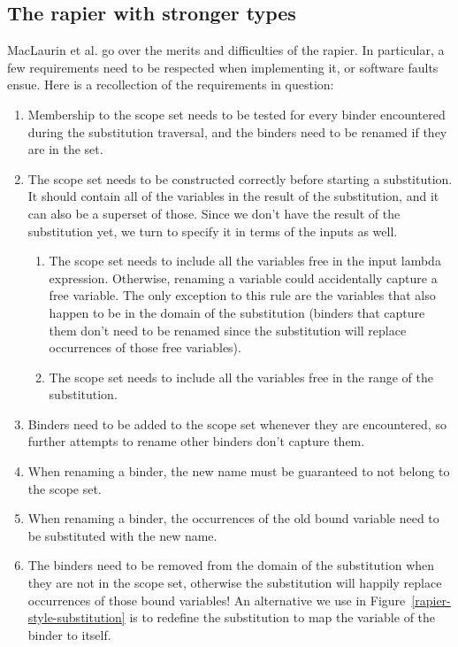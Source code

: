 \documentclass[acmtog, anonymous]{acmart}
\begin{document}
\subsection{The rapier with stronger types}
\label{the-rapier-with-stronger-types}

MacLaurin et al. go over the merits and difficulties of the rapier. In
particular, a few requirements need to be respected when implementing it, or
software faults ensue. Here is a recollection of the requirements in question:
\begin{enumerate}
\item Membership to the scope set needs to be tested for every binder encountered
      during the substitution traversal, and the binders need to be renamed if
      they are in the set.
\item The scope set needs to be constructed correctly before starting a substitution.
      It should contain all of the variables in the result of the substitution,
      and it can also be a superset of those. Since we don't have the result of
      the substitution yet, we turn to specify it in terms of the inputs as well.
      \begin{enumerate}
      \item The scope set needs to include all the variables free in the input
            lambda expression. Otherwise, renaming a variable could accidentally
            capture a free variable. The only exception to this rule are the
            variables that also happen to be in the domain of the substitution
            (binders that capture them don't need to be renamed since the substitution
            will replace occurrences of those free variables).
      \item The scope set needs to include all the variables free in the range
            of the substitution.
      \end{enumerate}
\item Binders need to be added to the scope set whenever they are encountered,
      so further attempts to rename other binders don't capture them.
\item When renaming a binder, the new name must be guaranteed to not belong to
      the scope set.
\item When renaming a binder, the occurrences of the old bound variable need to be
      substituted with the new name.
\item The binders need to be removed from the domain of the substitution when
      they are not in the scope set, otherwise the substitution will happily
      replace occurrences of those bound variables! An alternative we use in
      Figure~\ref{rapier-style-substitution} is to redefine the substitution to
      map the variable of the binder to itself.
\end{enumerate}
\end{document}
